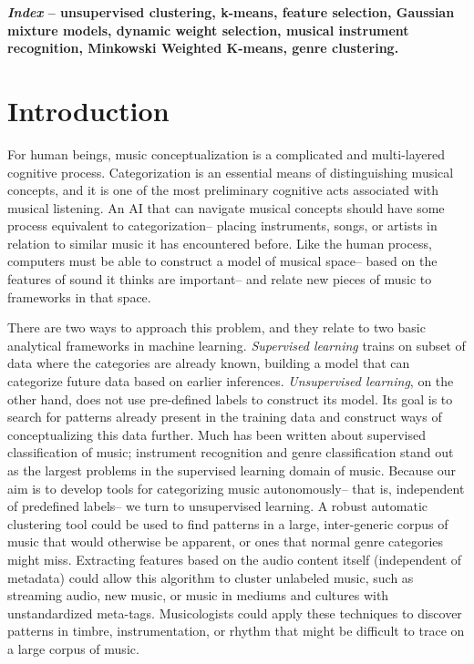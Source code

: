 \documentclass[12pt,twocolumn,titlepage]{article}
\begin{document}
\textbf{\emph{Index} -- unsupervised clustering, k-means, feature selection, Gaussian mixture models, dynamic weight selection, musical instrument recognition, Minkowski Weighted K-means, genre clustering.}



\section{Introduction}

For human beings, music conceptualization is a complicated and multi-layered cognitive process. Categorization is an essential means of distinguishing musical concepts, and it is one of the most preliminary cognitive acts associated with musical listening. \cite{Conceptualizing} An AI that can navigate musical concepts should have some process equivalent to categorization-- placing instruments, songs, or artists in relation to similar music it has encountered before. Like the human process, computers must be able to construct a model of musical space-- based on the features of sound it thinks are important-- and relate new pieces of music to frameworks in that space. 

There are two ways to approach this problem, and they relate to two basic analytical frameworks in machine learning. \emph{Supervised learning} trains on subset of data where the categories are already known, building a model that can categorize future data based on earlier inferences. \emph{Unsupervised learning}, on the other hand, does not use pre-defined labels to construct its model. Its goal is to search for patterns already present in the training data and construct ways of conceptualizing this data further. Much has been written about supervised classification of music; instrument recognition \cite{Essid} and genre classification \cite{MaggbladeHongKao} \cite{LiChan} stand out as the largest problems in the supervised learning domain of music. Because our aim is to develop tools for categorizing music autonomously-- that is, independent of predefined labels-- we turn to unsupervised learning. A robust automatic clustering tool could be used to find patterns in a large, inter-generic corpus of music that would otherwise be apparent, or ones that normal genre categories might miss. Extracting features based on the audio content itself (independent of metadata) could allow this algorithm to cluster unlabeled music, such as streaming audio, new music, or music in mediums and cultures with unstandardized meta-tags. Musicologists could apply these techniques to discover patterns in timbre, instrumentation, or rhythm that might be difficult to trace on a large corpus of music.
\end{document}
